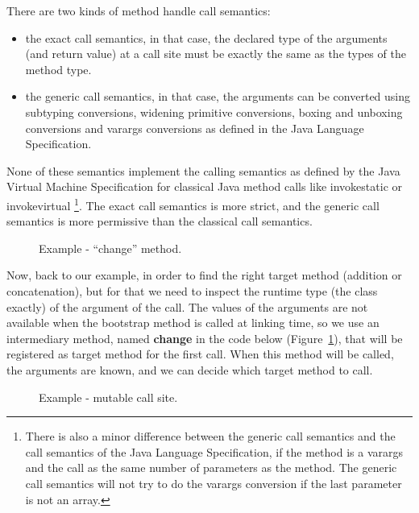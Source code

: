 \documentclass{sig-alternate}
\begin{document}
      There are two kinds of method handle call semantics:
      \begin{itemize}
        \item the exact call semantics, in that case, the declared type of the arguments (and return value) at a call site
              must be exactly the same as the types of the method type.
        \item the generic call semantics, in that case, the arguments can be converted using subtyping conversions,
              widening primitive conversions, boxing and unboxing conversions and varargs conversions
              as defined in the Java Language Specification.
      \end{itemize}
      None of these semantics implement the calling semantics as defined by the Java Virtual Machine Specification
      for classical Java method calls like invokestatic or invokevirtual
      \footnote{There is also a minor difference between the generic call semantics and the call semantics of
        the Java Language Specification, if the method is a varargs and the call as the same number of parameters as the method.
        The generic call semantics will not try to do the varargs conversion if the last parameter is not an array.}.
      The exact call semantics is more strict, and the generic call semantics is more permissive than the classical call semantics.

      \begin{figure}[!ht]
        \centering \vspace{-1.5em}
        \caption{Example - ``change'' method.}\vspace{-.7em}
        \label{fooCHANGE}
      \end{figure}

      Now, back to our example, in order to find the right target method (addition or concatenation),
      but for that we need to inspect the runtime type (the class exactly) of the argument of the call.
      The values of the arguments are not available when the bootstrap method is called at linking time,
      so we use an intermediary method, named {\bf change} in the code below (Figure~\ref{fooCHANGE}),
      that will be registered as target method for the first call.
      When this method will be called, the arguments are known, and we can decide which target method to call.

      \begin{figure}[!ht]
        \centering \vspace{-1.5em}
        \caption{Example - mutable call site.}\vspace{-.25em}
        \label{fooMCS}
      \end{figure}
\end{document}

